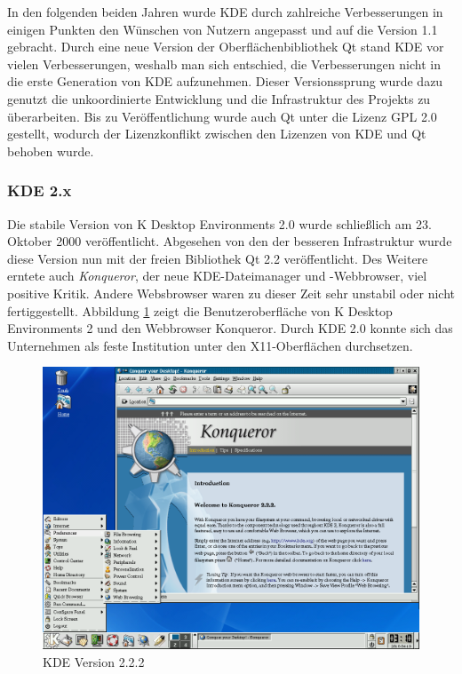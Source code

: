 In den folgenden beiden Jahren wurde KDE durch zahlreiche Verbesserungen in einigen Punkten den Wünschen von Nutzern angepasst und auf die Version 1.1 gebracht. Durch eine neue Version der Oberflächenbibliothek Qt stand KDE vor vielen Verbesserungen, weshalb man sich entschied, die Verbesserungen nicht in die erste Generation von KDE aufzunehmen. Dieser Versionssprung wurde dazu genutzt die unkoordinierte Entwicklung und die Infrastruktur des Projekts zu überarbeiten. Bis zu Veröffentlichung wurde auch Qt unter die Lizenz GPL 2.0 gestellt, wodurch der Lizenzkonflikt zwischen den Lizenzen von KDE und Qt behoben wurde.

\subsubsection{KDE 2.x}
Die stabile Version von K Desktop Environments 2.0 wurde schließlich am 23. Oktober 2000 veröffentlicht. Abgesehen von den der besseren Infrastruktur wurde diese Version nun mit der freien Bibliothek Qt 2.2 veröffentlicht. Des Weitere erntete auch \textit{Konqueror}, der neue KDE-Dateimanager und -Webbrowser, viel positive Kritik. Andere Websbrowser waren zu dieser Zeit sehr unstabil oder nicht fertiggestellt. Abbildung \ref{fig:kdeversion2} zeigt die Benutzeroberfläche von K Desktop Environments 2 und den Webbrowser Konqueror. Durch KDE 2.0 konnte sich das Unternehmen als feste Institution unter den X11-Oberflächen durchsetzen. \cite{kdeversionenwiki, geschichtekde}

\begin{figure}[h]
	\centering
	\includegraphics[width=\linewidth]{images/KDE_222.png}
	\caption{KDE Version 2.2.2 \cite{kdeversionenwiki}}
	\label{fig:kdeversion2}
\end{figure}

